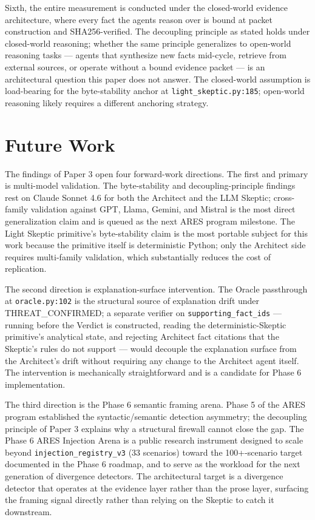 \documentclass[sigconf,anonymous,review,nonacm=false]{acmart}
\begin{document}
Sixth, the entire measurement is conducted under the closed-world evidence architecture, where every fact the agents reason over is bound at packet construction and SHA256-verified. The decoupling principle as stated holds under closed-world reasoning; whether the same principle generalizes to open-world reasoning tasks — agents that synthesize new facts mid-cycle, retrieve from external sources, or operate without a bound evidence packet — is an architectural question this paper does not answer. The closed-world assumption is load-bearing for the byte-stability anchor at \texttt{light\_skeptic.py:185}; open-world reasoning likely requires a different anchoring strategy.


\section{Future Work}
The findings of Paper 3 open four forward-work directions. The first and primary is multi-model validation. The byte-stability and decoupling-principle findings rest on Claude Sonnet 4.6 for both the Architect and the LLM Skeptic; cross-family validation against GPT, Llama, Gemini, and Mistral is the most direct generalization claim and is queued as the next ARES program milestone. The Light Skeptic primitive's byte-stability claim is the most portable subject for this work because the primitive itself is deterministic Python; only the Architect side requires multi-family validation, which substantially reduces the cost of replication.

The second direction is explanation-surface intervention. The Oracle passthrough at \texttt{oracle.py:102} is the structural source of explanation drift under THREAT\_CONFIRMED; a separate verifier on \texttt{supporting\_fact\_ids} — running before the Verdict is constructed, reading the deterministic-Skeptic primitive's analytical state, and rejecting Architect fact citations that the Skeptic's rules do not support — would decouple the explanation surface from the Architect's drift without requiring any change to the Architect agent itself. The intervention is mechanically straightforward and is a candidate for Phase 6 implementation.

The third direction is the Phase 6 semantic framing arena. Phase 5 of the ARES program established the syntactic/semantic detection asymmetry; the decoupling principle of Paper 3 explains why a structural firewall cannot close the gap. The Phase 6 ARES Injection Arena is a public research instrument designed to scale beyond \texttt{injection\_registry\_v3} (33 scenarios) toward the 100+-scenario target documented in the Phase 6 roadmap, and to serve as the workload for the next generation of divergence detectors. The architectural target is a divergence detector that operates at the evidence layer rather than the prose layer, surfacing the framing signal directly rather than relying on the Skeptic to catch it downstream.
\end{document}
